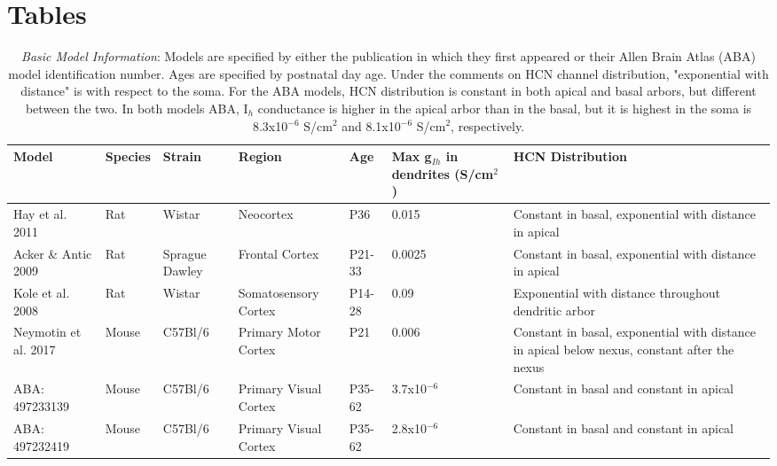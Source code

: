 \documentclass[utf8]{frontiersSCNS} %
\begin{document}

\section{Tables}
\begin{table}[h!]
\begin{center}
    \begin{tabular}{m{2cm}|m{1.25cm}|m{2cm}|m{2.5cm}|m{1cm}|m{2cm}|m{3.75cm}}
        \hline
        \textbf{Model} & \textbf{Species} & \textbf{Strain} & \textbf{Region} & \textbf{Age} & \textbf{Max g$_{Ih}$ in dendrites (S/cm$^2$)} & \textbf{HCN Distribution}  \\ \hline
        Hay et al. 2011 & Rat & Wistar & Neocortex & P36 & 0.015 & Constant in basal, exponential with distance in  apical \\ \hline
        Acker \& Antic 2009 & Rat & Sprague Dawley & Frontal Cortex & P21-33 & 0.0025 & Constant in basal, exponential with distance in  apical \\ \hline
        Kole et al. 2008 & Rat & Wistar & Somatosensory Cortex & P14-28 & 0.09 & Exponential with distance throughout dendritic arbor \\ \hline
        Neymotin et al. 2017 & Mouse & C57Bl/6 & Primary Motor Cortex & P21 & 0.006 & Constant in basal, exponential with distance in  apical
        below nexus, constant after the nexus \\ \hline
        ABA: 497233139 & Mouse & C57Bl/6 & Primary Visual Cortex & P35-62 & 3.7x10$^{-6}$
        & Constant in basal and constant in apical \\  \hline
        ABA: 497232419 & Mouse & C57Bl/6 & Primary Visual Cortex & P35-62 & 2.8x10$^{-6}$
        & Constant in basal and constant in apical \\ \hline
    \end{tabular}
\end{center}
\caption{\emph{Basic Model Information}: Models are specified by either the publication in which they first appeared or their Allen Brain Atlas 
(ABA) model identification number.  Ages are specified by postnatal day age. Under the comments on HCN channel distribution, "exponential with distance"
is with  respect to the soma.  For the ABA models, HCN distribution is constant in both apical and basal arbors, but different between the two.
In both models ABA, I$_h$ conductance is higher in the apical arbor than in the basal, but it is highest in the soma is 8.3x10$^{-6}$ S/cm$^2$ and 
8.1x10$^{-6}$ S/cm$^2$, respectively.}   
\label{Table 1}
\end{table}
\end{document}
